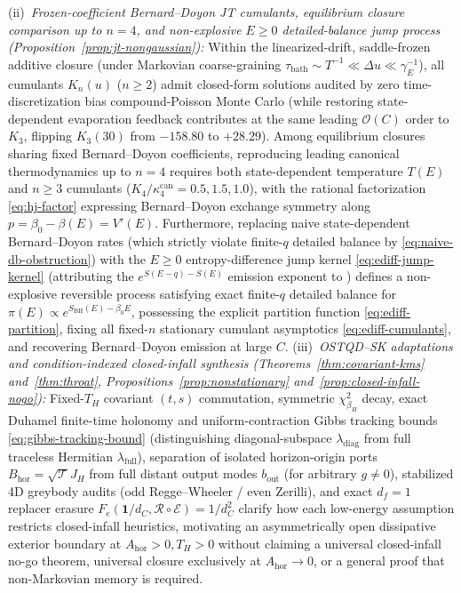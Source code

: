 \documentclass[11pt,a4paper]{article}
\theoremstyle{definition}
\theoremstyle{remark}
\newcommand{\cE}{\mathcal{E}}
\newcommand{\cR}{\mathcal{R}}
\newcommand{\cT}{\mathcal{T}}
\newcommand{\1}{\mathbf{1}}
\begin{document}
\begin{itemize}
  (ii)~\emph{Frozen-coefficient Bernard--Doyon JT cumulants, equilibrium closure comparison up to $n=4$, and non-explosive $E\ge 0$ detailed-balance jump process (Proposition~\ref{prop:jt-nongaussian}):} Within the linearized-drift, saddle-frozen additive closure (under Markovian coarse-graining $\tau_{\mathrm{bath}}\sim T^{-1}\ll\Delta u\ll\gamma_E^{-1}$), all cumulants $K_n(u)$ ($n\ge 2$) admit closed-form solutions audited by zero time-discretization bias compound-Poisson Monte Carlo (while restoring state-dependent evaporation feedback contributes at the same leading $\mathcal{O}(C)$ order to $K_3$, flipping $K_3(30)$ from $-158.80$ to $+28.29$). Among equilibrium closures sharing fixed Bernard--Doyon coefficients, reproducing leading canonical thermodynamics up to $n=4$ requires both state-dependent temperature $T(E)$ and $n\ge 3$ cumulants ($K_4/\kappa_4^{\mathrm{can}}=0.5, 1.5, 1.0$), with the rational factorization \eqref{eq:hj-factor} expressing Bernard--Doyon exchange symmetry along $p=\beta_0-\beta(E)=V'(E)$. Furthermore, replacing naive state-dependent Bernard--Doyon rates (which strictly violate finite-$q$ detailed balance by \eqref{eq:naive-db-obstruction}) with the $E\ge 0$ entropy-difference jump kernel \eqref{eq:ediff-jump-kernel} (attributing the $e^{S(E-q)-S(E)}$ emission exponent to \cite{MassarParentani2000,ParikhWilczek2000}) defines a non-explosive reversible process satisfying exact finite-$q$ detailed balance for $\pi(E)\propto e^{S_{\mathrm{BH}}(E)-\beta_0 E}$, possessing the explicit partition function \eqref{eq:ediff-partition}, fixing all fixed-$n$ stationary cumulant asymptotics \eqref{eq:ediff-cumulants}, and recovering Bernard--Doyon emission at large $C$.
  (iii)~\emph{OSTQD--SK adaptations and condition-indexed closed-infall synthesis (Theorems~\ref{thm:covariant-kms} and~\ref{thm:throat}, Propositions~\ref{prop:nonstationary} and~\ref{prop:closed-infall-nogo}):} Fixed-$T_H$ covariant $(t,s)$ commutation, symmetric $\chi^2_{\beta_H}$ decay, exact Duhamel finite-time holonomy and uniform-contraction Gibbs tracking bounds \eqref{eq:gibbs-tracking-bound} (distinguishing diagonal-subspace $\lambda_{\mathrm{diag}}$ from full traceless Hermitian $\lambda_{\mathrm{full}}$), separation of isolated horizon-origin ports $B_{\mathrm{hor}}=\sqrt{\cT}J_H$ from full distant output modes $b_{\mathrm{out}}$ (for arbitrary $g\neq 0$), stabilized 4D greybody audits (odd Regge--Wheeler / even Zerilli), and exact $d_f=1$ replacer erasure $F_e(\1/d_C,\cR\circ\cE)=1/d_C^2$ clarify how each low-energy assumption restricts closed-infall heuristics, motivating an asymmetrically open dissipative exterior boundary at $A_{\mathrm{hor}}>0, T_H>0$ without claiming a universal closed-infall no-go theorem, universal closure exclusively at $A_{\mathrm{hor}}\to 0$, or a general proof that non-Markovian memory is required.

\end{itemize}
\end{document}
